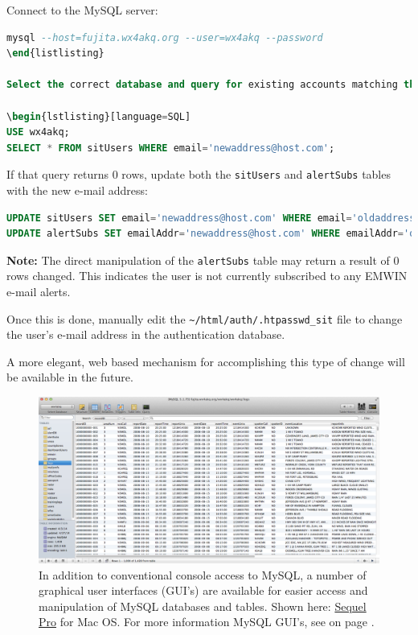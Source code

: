 \documentclass[pdflatex,letterpaper,twoside,12pt]{book}
\begin{document}
Connect to the MySQL server:

\begin{lstlisting}[language=SQL]
mysql --host=fujita.wx4akq.org --user=wx4akq --password
\end{listlisting}

Select the correct database and query for existing accounts matching the new e-mail address:

\begin{lstlisting}[language=SQL]
USE wx4akq;
SELECT * FROM sitUsers WHERE email='newaddress@host.com';
\end{lstlisting}

If that query returns 0 rows, update both the \verb|sitUsers| and \verb|alertSubs| tables with the new e-mail address:

\begin{lstlisting}[language=SQL]
UPDATE sitUsers SET email='newaddress@host.com' WHERE email='oldaddress@host.com';
UPDATE alertSubs SET emailAddr='newaddress@host.com' WHERE emailAddr='oldaddress@host.com';
\end{lstlisting}

{\bf Note:}  The direct manipulation of the \verb|alertSubs| table may return a result of 0 rows changed.  This indicates the user is not currently subscribed to any EMWIN e-mail alerts.

Once this is done, manually edit the \verb|~/html/auth/.htpasswd_sit| file to change the user's e-mail address in the authentication database.

A more elegant, web based mechanism for accomplishing this type of change will be available in the future.

\begin{figure}[t]
  \centering
  \includegraphics[width=\textwidth,keepaspectratio=true]{img/sequel-pro}
  \caption{In addition to conventional console access to MySQL, a number of graphical user interfaces (GUI's) are available for easier access and manipulation of MySQL databases and tables.  Shown here: \href{http://www.sequelpro.com/}{Sequel Pro} for Mac OS.  For more information MySQL GUI's, see  on page \pageref{database-server}.\label{fig:sequel-pro}}
\end{figure}
\end{document}
